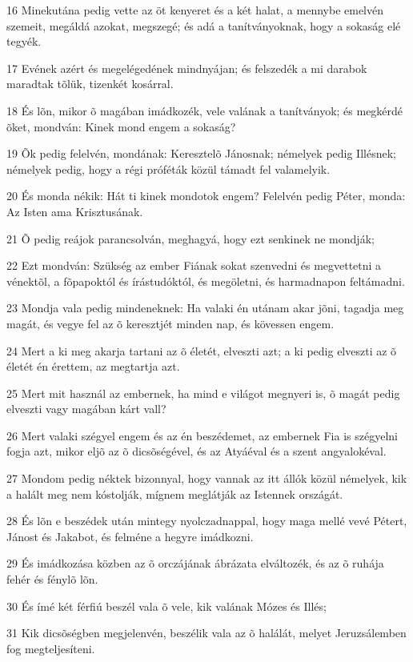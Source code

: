 \par 16 Minekutána pedig vette az öt kenyeret és a két halat, a mennybe emelvén szemeit, megáldá azokat, megszegé; és adá a tanítványoknak, hogy a sokaság elé tegyék.
\par 17 Evének azért és megelégedének mindnyájan; és felszedék a mi darabok maradtak tõlük, tizenkét kosárral.
\par 18 És lõn, mikor õ magában imádkozék, vele valának a tanítványok; és megkérdé õket, mondván: Kinek mond engem a sokaság?
\par 19 Õk pedig felelvén, mondának: Keresztelõ Jánosnak; némelyek pedig Illésnek; némelyek pedig, hogy a régi próféták közül támadt fel valamelyik.
\par 20 És monda nékik: Hát ti kinek mondotok engem? Felelvén pedig Péter, monda: Az Isten ama Krisztusának.
\par 21 Õ pedig reájok parancsolván, meghagyá, hogy ezt senkinek ne mondják;
\par 22 Ezt mondván: Szükség az ember Fiának sokat szenvedni és megvettetni a vénektõl, a fõpapoktól és írástudóktól, és megöletni, és harmadnapon feltámadni.
\par 23 Mondja vala pedig mindeneknek: Ha valaki én utánam akar jõni, tagadja meg magát, és vegye fel az õ keresztjét minden nap, és kövessen engem.
\par 24 Mert a ki meg akarja tartani az õ életét, elveszti azt; a ki pedig elveszti az õ életét én érettem, az megtartja azt.
\par 25 Mert mit használ az embernek, ha mind e világot megnyeri is, õ magát pedig elveszti vagy magában kárt vall?
\par 26 Mert valaki szégyel engem és az én beszédemet, az embernek Fia is szégyelni fogja azt, mikor eljõ az õ  dicsõségével, és az Atyáéval és a szent angyalokéval.
\par 27 Mondom pedig néktek bizonnyal, hogy vannak az itt állók közül némelyek, kik a halált meg nem kóstolják, mígnem meglátják az Istennek országát.
\par 28 És lõn e beszédek után mintegy nyolczadnappal, hogy maga mellé vevé Pétert, Jánost és Jakabot, és felméne a hegyre imádkozni.
\par 29 És imádkozása közben az õ orczájának ábrázata elváltozék, és az õ ruhája fehér és fénylõ lõn.
\par 30 És ímé két férfiú beszél vala õ vele, kik valának Mózes és Illés;
\par 31 Kik dicsõségben megjelenvén, beszélik vala az õ halálát, melyet Jeruzsálemben fog megteljesíteni.
